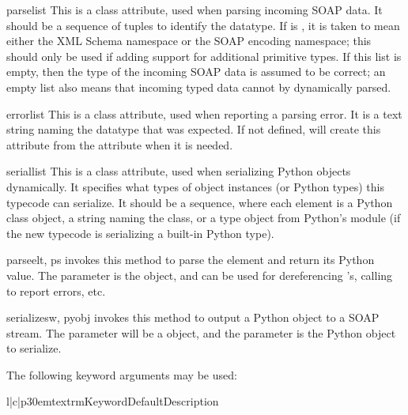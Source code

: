 \begin{memberdesc}{parselist}
This is a class attribute, used when parsing incoming SOAP data.
It should be a sequence of  tuples to identify
the datatype.
If  is , it is taken to mean either the XML Schema
namespace or the SOAP encoding namespace;
this should only be used if adding support for additional primitive types.
If this list is empty, then the type of the incoming SOAP data is assumed
to be correct; an empty list also means that incoming typed data cannot
by dynamically parsed.
\end{memberdesc}

\begin{memberdesc}{errorlist}
This is a class attribute, used when reporting a parsing error.
It is a text string naming the datatype that was expected.
If not defined, \ZSI{} will create this attribute from the 
attribute when it is needed.
\end{memberdesc}

\begin{memberdesc}{seriallist}
This is a class attribute, used when serializing Python objects
dynamically.
It specifies what types of object instances (or Python types) this
typecode can serialize.
It should be a sequence, where each element is a Python class object,
a string naming the class, or a type object from Python's 
module (if the
new typecode is serializing a built-in Python type).
\end{memberdesc}

\begin{methoddesc}{parse}{elt, ps}
\ZSI{} invokes this method to
parse the  element and return its Python value.
The  parameter is the  object, and can be
used for dereferencing 's, calling  to
report errors, etc.
\end{methoddesc}

\begin{methoddesc}{serialize}{sw, pyobj}
\ZSI{} invokes this method to output a Python object to a SOAP stream.
The  parameter will be a  object, and
the  parameter is the Python object to serialize.

The following keyword arguments may be used:

\begin{tableiii}{l|c|p{30em}}{textrm}{Keyword}{Default}{Description}
\end{tableiii}
\end{methoddesc}

